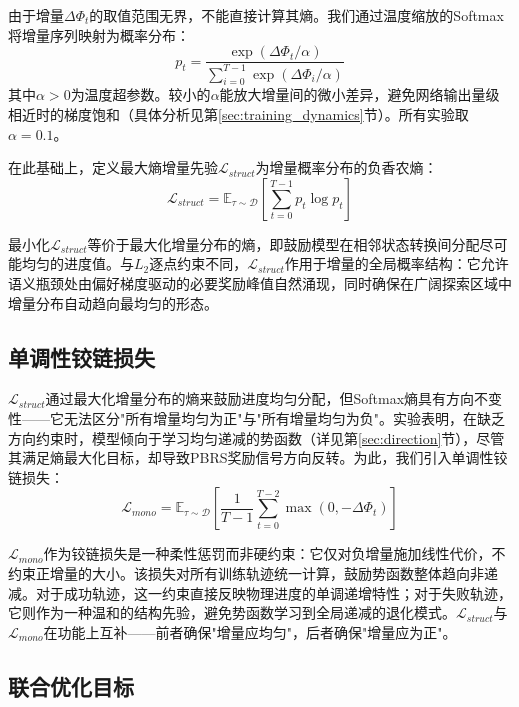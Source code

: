 由于增量$\Delta\Phi_t$的取值范围无界，不能直接计算其熵。我们通过温度缩放的Softmax将增量序列映射为概率分布：
\begin{equation}
\label{eq:softmax}
    p_t = \frac{\exp(\Delta\Phi_t / \alpha)}{\sum_{i=0}^{T-1} \exp(\Delta\Phi_i / \alpha)}
\end{equation}
其中$\alpha > 0$为温度超参数。较小的$\alpha$能放大增量间的微小差异，避免网络输出量级相近时的梯度饱和（具体分析见第\ref{sec:training_dynamics}节）。所有实验取$\alpha = 0.1$。

在此基础上，定义最大熵增量先验$\mathcal{L}_{struct}$为增量概率分布的负香农熵：
\begin{equation}
\label{eq:lstruct}
    \mathcal{L}_{struct} = \mathbb{E}_{\tau \sim \mathcal{D}} \left[ \sum_{t=0}^{T-1} p_t \log p_t \right]
\end{equation}

最小化$\mathcal{L}_{struct}$等价于最大化增量分布的熵，即鼓励模型在相邻状态转换间分配尽可能均匀的进度值。与$L_2$逐点约束不同，$\mathcal{L}_{struct}$作用于增量的全局概率结构：它允许语义瓶颈处由偏好梯度驱动的必要奖励峰值自然涌现，同时确保在广阔探索区域中增量分布自动趋向最均匀的形态。

\subsection{单调性铰链损失}

$\mathcal{L}_{struct}$通过最大化增量分布的熵来鼓励进度均匀分配，但Softmax熵具有方向不变性——它无法区分"所有增量均匀为正"与"所有增量均匀为负"。实验表明，在缺乏方向约束时，模型倾向于学习均匀递减的势函数（详见第\ref{sec:direction}节），尽管其满足熵最大化目标，却导致PBRS奖励信号方向反转。为此，我们引入单调性铰链损失：
\begin{equation}
\label{eq:lmono}
    \mathcal{L}_{mono} = \mathbb{E}_{\tau \sim \mathcal{D}} \left[ \frac{1}{T-1}\sum_{t=0}^{T-2} \max(0, -\Delta\Phi_t) \right]
\end{equation}

$\mathcal{L}_{mono}$作为铰链损失是一种柔性惩罚而非硬约束：它仅对负增量施加线性代价，不约束正增量的大小。该损失对所有训练轨迹统一计算，鼓励势函数整体趋向非递减。对于成功轨迹，这一约束直接反映物理进度的单调递增特性；对于失败轨迹，它则作为一种温和的结构先验，避免势函数学习到全局递减的退化模式。$\mathcal{L}_{struct}$与$\mathcal{L}_{mono}$在功能上互补——前者确保"增量应均匀"，后者确保"增量应为正"。

\subsection{联合优化目标}
\label{sec:joint_objective}

